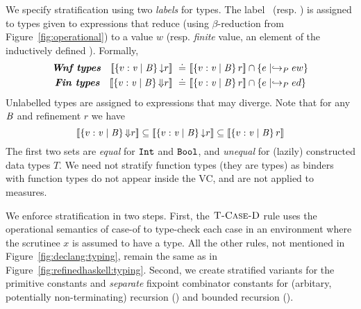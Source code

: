 We specify stratification using two \emph{labels} for types.
%
The label \trivial\ (resp. \finite) is assigned to types given 
to expressions that reduce (using $\beta$-reduction from Figure~\ref{fig:operational})  
to a value $w$ (resp. \emph{finite} value,
\ie an element of the inductively defined \dom).
%
Formally,
%
\begin{align}
  \mbox{\emphbf{\Wnf types}} \quad 
\interp{\tref{\vv}{\Base}{\trivial}{r}} \defeq & 
    \interp{\tref{\vv}{\Base}{}{r}} \cap \{ e \mid \evals{e}{w} \}
    \label{eq:trivial} \\
  \mbox{\emphbf{\Fin types}} \quad 
\interp{\tref{\vv}{\Base}{\finite}{r}} \defeq & 
    \interp{\tref{\vv}{\Base}{}{r}} \cap \{ e \mid \evals{e}{d} \} 
    \label{eq:finite} 
\end{align}
%
Unlabelled types are assigned to expressions that may diverge.
%
Note that for any $\mathit{B}$ and refinement $r$ we have
$$
[\![\left\lbrace v : \mathit{v}\mid \mathit{B}\right\rbrace{\ensuremath{\Downarrow}}{r}]\!] \subseteq
[\![\left\lbrace v : \mathit{v}\mid \mathit{B}\right\rbrace{\ensuremath{\downarrow}}{r}]\!] \subseteq
[\![\left\lbrace v : \mathit{v}\mid \mathit{B}\right\rbrace{}{r}]\!]
$$ 
%
The first two sets are \emph{equal} for $\mathtt{Int}$ and $\texttt{Bool}$, 
and \emph{unequal} for (lazily) constructed data types $T$. 
%
We need not stratify function types (\ie they are \Div types)
as binders with function types do not appear inside the VC, and 
are not applied to measures.

\label{sec:typing:termination}
%
We enforce stratification in two steps.
%
First, the $\textsc{T-Case-D}$ rule uses the operational semantics of case-of to 
type-check each case in an environment where the scrutinee
$x$ is assumed to have a \Wnf type. 
%
All the other rules, not mentioned in Figure~\ref{fig:declang:typing},
remain the same as in Figure~\ref{fig:refinedhaskell:typing}.
%
Second, we create stratified variants for the primitive constants 
and \emph{separate} fixpoint combinator constants for 
(arbitary, potentially non-terminating) recursion (\efix{}) 
and bounded recursion (\etfix{}).

